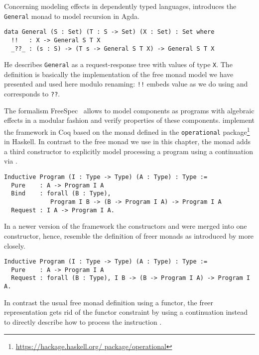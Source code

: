 Concerning modeling effects in dependently typed languages,
\cite{mcbride2015turingcompleteness} introduces the \texttt{General}
monad to model recursion in Agda.

\begin{verbatim}
data General (S : Set) (T : S -> Set) (X : Set) : Set where
  !!   : X -> General S T X
  _??_ : (s : S) -> (T s -> General S T X) -> General S T X
\end{verbatim}

He describes \texttt{General} as a request-response tree with values
of type \texttt{X}.
The definition is basically the implementation of the free monad model we
have presented and used here modulo renaming: \texttt{!!} embeds
value as we do using  and  corresponds to
\texttt{??}.

The formalism FreeSpec~\citep{letan2018modular} allows to model
components as programs with algebraic effects in a modular fashion
and verify properties of these components.
\citeauthor{letan2018modular} implement the framework in Coq based on
the  monad defined in the \texttt{operational} package\footnote{\url{https://hackage.haskell.org/
    package/operational}} in Haskell.
In contrast to the free monad we use in this chapter, the
 monad adds a third constructor to explicitly model
processing a program using a continuation via .

\begin{verbatim}
Inductive Program (I : Type -> Type) (A : Type) : Type :=
  Pure    : A -> Program I A
  Bind    : forall (B : Type),
             Program I B -> (B -> Program I A) -> Program I A
  Request : I A -> Program I A.
\end{verbatim}

In a newer version of the framework the constructors  and
 were merged into one constructor, hence, resemble the
definition of freer monads as introduced by \citet{kiselyov2015freer}
more closely.

\begin{verbatim}
Inductive Program (I : Type -> Type) (A : Type) : Type :=
  Pure    : A -> Program I A
  Request : forall (B : Type), I B -> (B -> Program I A) -> Program I A.
\end{verbatim}

In contrast the usual free monad definition using a functor, the freer
representation gets rid of the functor constraint by using a
continuation  instead to directly describe how
to process the instruction .

